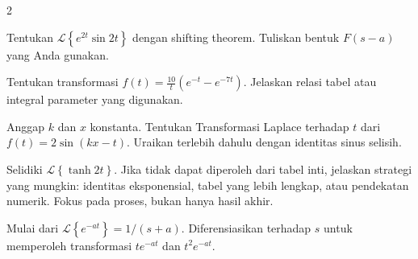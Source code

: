 \documentclass[10pt,a4paper]{article}
\newcommand{\level}[1]{\colorbox{levelbg}{\scriptsize\strut #1}}
\newcommand{\src}[1]{\colorbox{sourcebg}{\scriptsize\strut #1}}
\newcommand{\Lap}[1]{\mathcal{L}\left\{#1\right\}}
\begin{document}
\begin{multicols}{2}
\begin{qbox}[title={M2.8: Eksponensial kali sinus\hfill \level{L2}\;\src{PR}}]
\small Tentukan $\Lap{e^{2t}\sin 2t}$ dengan shifting theorem. Tuliskan bentuk $F(s-a)$ yang Anda gunakan.
\end{qbox}
\begin{qbox}[title={M2.9: Selisih eksponensial dibagi $t$\hfill \level{L3}\;\src{PR}}]
\small Tentukan transformasi $\displaystyle f(t)=\frac{10}{t}(e^{-t}-e^{-7t})$. Jelaskan relasi tabel atau integral parameter yang digunakan.
\end{qbox}
\begin{qbox}[title={M2.10: Gelombang bergeser\hfill \level{L3}\;\src{PR}}]
\small Anggap $k$ dan $x$ konstanta. Tentukan Transformasi Laplace terhadap $t$ dari $f(t)=2\sin(kx-t)$. Uraikan terlebih dahulu dengan identitas sinus selisih.
\end{qbox}
\begin{qbox}[title={M2.11: Tanh sebagai tantangan\hfill \level{L4}\;\src{PR}}]
\small Selidiki $\Lap{\tanh 2t}$. Jika tidak dapat diperoleh dari tabel inti, jelaskan strategi yang mungkin: identitas eksponensial, tabel yang lebih lengkap, atau pendekatan numerik. Fokus pada proses, bukan hanya hasil akhir.
\end{qbox}
\begin{qbox}[title={M2.12: Turunkan rumus dari parameter\hfill \level{L3}\;\src{Boas}}]
\small Mulai dari $\Lap{e^{-at}}=1/(s+a)$. Diferensiasikan terhadap $s$ untuk memperoleh transformasi $te^{-at}$ dan $t^2e^{-at}$.
\end{qbox}
\end{multicols}
\newpage
\end{document}
